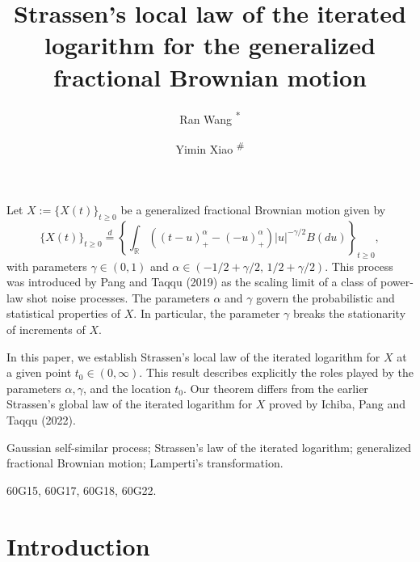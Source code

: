 \documentclass[11pt, reqno]{amsart}
\title[Strassen's local LIL for GFBM]{Strassen's  local law of the iterated logarithm for the generalized fractional Brownian motion}
\author[R. Wang]{Ran Wang \textsuperscript{*}}
\author[Y. Xiao]{Yimin Xiao \textsuperscript{$\#$}}
\date{}
\numberwithin{equation}{section}
\newcommand{\1}{{\bf 1}}
\newcommand{\2}{{\bf 2}}
\begin{document}
\maketitle
 \vskip-0.3cm
 Let $X:=\{X(t)\}_{t\ge0}$ be a generalized fractional Brownian motion given by
$$
 \{X(t)\}_{t\ge0}\overset{d}{=}\left\{  \int_{\mathbb R}  \left((t-u)_+^{\alpha}-(-u)_+^{\alpha} \right) |u|^{-\gamma/2} B(du)  \right\}_{t\ge0},
$$
with parameters $\gamma \in (0, 1)$ and $\alpha\in \left(-1/2+ 
\gamma/2, \,  1/2+\gamma/2\right)$. This 
process was introduced by Pang and Taqqu (2019) as the scaling
limit of a class of power-law shot noise processes. The
parameters $\alpha$ and $\gamma$ govern  the probabilistic and 
statistical properties of  $X$. In particular, the parameter 
$\gamma$  breaks the stationarity of increments of $X$.

In this paper, we establish Strassen's local law of the 
iterated logarithm for $X$ at a given point $t_0 \in (0, 
\infty)$. This result describes explicitly the roles played by
the parameters $\alpha, \gamma$, and the location $t_0$.  Our 
theorem  differs from the  earlier Strassen's  
{global law of the iterated logarithm} for $X$  proved by 
Ichiba, Pang and Taqqu (2022).
 \vskip0.3cm

  {Gaussian self-similar process; Strassen's   {law of the iterated logarithm}; generalized fractional Brownian motion;  
 Lamperti's transformation.}

 \vskip0.5cm

 {60G15, 60G17, 60G18, 60G22.}

 

 





 \section{Introduction}

\end{document}
